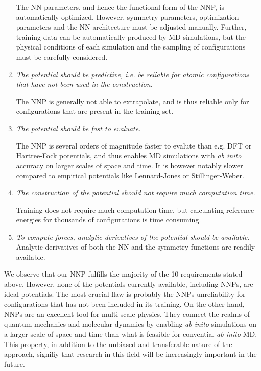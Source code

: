 \documentclass[twoside,english]{uiofysmaster}
\begin{document}
\begin{enumerate}
       The NN parameters, and hence the functional form of the NNP, is automatically optimized. However, 
       symmetry parameters, optimization parameters and the NN architecture must be adjusted manually. 
       Further, training data can be automatically produced by MD simulations, but the physical conditions 
       of each simulation and the sampling of configurations must be carefully considered. 
 \item \textit{The potential should be predictive, i.e. be reliable for atomic configurations that have not been used in the 
       construction.}
       
       The NNP is generally not able to extrapolate, and is thus reliable only for configurations that are present in 
       the training set. 
       
 \item \textit{The potential should be fast to evaluate.}
 
       The NNP is several orders of magnitude faster to evalute than e.g. DFT or Hartree-Fock potentials, 
       and thus enables MD simulations with \textit{ab inito} accuracy on larger scales of space and time.  
       It is however notably slower compared to empirical potentials like Lennard-Jones or Stillinger-Weber. 
 \item \textit{The construction of the potential should not require much computation time.}
 
       Training does not require much computation time, but calculating reference energies for thousands of configurations
       is time consuming. 
 \item \textit{To compute forces, analytic derivatives of the potential should be available.}
       Analytic derivatives of both the NN and the symmetry functions are readily available. 
\end{enumerate}
We observe that our NNP fulfills the majority of the 10 requirements stated above.  
However, none of the potentials currently available, including NNPs, are ideal potentials.
The most crucial flaw is probably the NNPs unreliability for configurations that has not been included in its training. 
On the other hand, NNPs are an excellent tool for multi-scale physics. They connect the realms of quantum mechanics 
and molecular dynamics by enabling \textit{ab inito} simulations on a larger scale of space and time than what is feasible 
for convential \textit{ab inito} MD. This property, in addition to the unbiased and transferable nature of the approach, 
signifiy that research in this field will be increasingly important in the future. 
\end{document}

